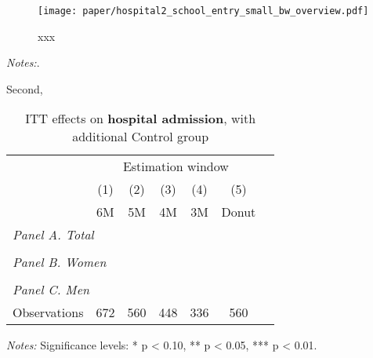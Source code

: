 \begin{landscape}
	\vspace*{\fill}
	\begin{figure}[H]\centering\caption{xxx}\label{fig_mlch: hospital2_school_cutoff}
		\texttt{[image: paper/hospital2\_school\_entry\_small\_bw\_overview.pdf]}
	\end{figure}
	\scriptsize
	\begin{minipage}{0.9\linewidth}
		\emph{Notes:}.
	\end{minipage}
	\vspace*{\fill}\clearpage
\end{landscape}







Second, 




\vspace*{\fill}
\begin{table}[H] \centering 
	\begin{threeparttable} \centering \caption{ITT effects on \textbf{hospital admission}, with additional Control group}\label{XXXXXX}
		{\def\sym#1{\ifmmode^{#1}\else\(^{#1}\)\fi} 
			\begin{tabular}{l*{6}{c}}
				\toprule 
				& \multicolumn{5}{c}{Estimation window} \\ 
				\cmidrule(lr){2-6}
				&\multicolumn{1}{c}{(1)}&\multicolumn{1}{c}{(2)}&\multicolumn{1}{c}{(3)}&\multicolumn{1}{c}{(4)}&\multicolumn{1}{c}{(5)}\\
				&\multicolumn{1}{c}{6M}&\multicolumn{1}{c}{5M}&\multicolumn{1}{c}{4M}&\multicolumn{1}{c}{3M}&\multicolumn{1}{c}{Donut}\\
				\midrule
				\multicolumn{6}{l}{\textit{Panel A. Total}}\\
				 
				\\
				\multicolumn{6}{l}{\textit{Panel B. Women}}\\
				
				\\
				\multicolumn{6}{l}{\textit{Panel C. Men}}\\
				
				\midrule
				Observations &   672     &        560      &       448        &     336        &     560 \\
				\bottomrule 
		\end{tabular}}
		\begin{tablenotes} 
			\item \scriptsize \emph{Notes:} \newline Significance levels: * p < 0.10, ** p < 0.05, *** p < 0.01.
		\end{tablenotes} 
	\end{threeparttable} 
\end{table}
\vspace*{\fill}\clearpage 




